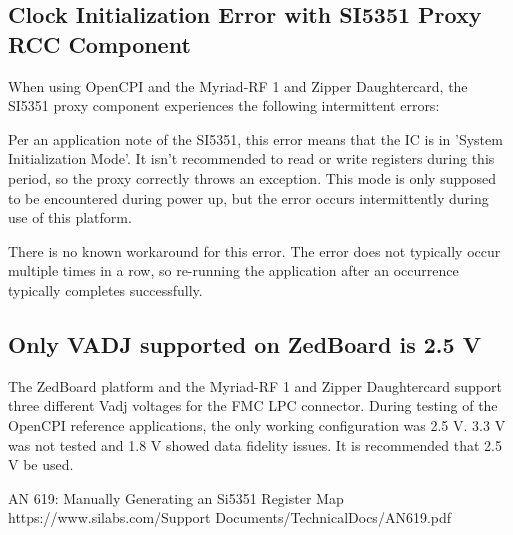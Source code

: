 \subsection*{Clock Initialization Error with SI5351 Proxy RCC Component}
When using OpenCPI and the Myriad-RF 1 and Zipper Daughtercard, the SI5351 proxy component experiences the following intermittent errors:\par\medskip
\noindent {}\par\medskip
\noindent {}\par\medskip
\noindent Per an application note of the SI5351\cite{an_619}, this error means that the IC is in 'System Initialization Mode'. It isn't recommended to read or write registers during this period, so the proxy correctly throws an exception. This mode is only supposed to be encountered during power up, but the error occurs intermittently  during use of this platform.\par\medskip
\noindent There is no known workaround for this error. The error does not typically occur multiple times in a row, so re-running the application after an occurrence typically completes successfully.
\subsection*{Only VADJ supported on ZedBoard is 2.5 V}
The ZedBoard platform  and the Myriad-RF 1 and Zipper Daughtercard support three different Vadj voltages for the FMC LPC connector. During testing of the OpenCPI reference applications, the only working configuration was 2.5 V. 3.3 V was not tested and 1.8 V showed data fidelity issues.  It is recommended that 2.5 V be used.
\pagebreak
  \begin{thebibliography}{1}

   AN 619: Manually Generating an Si5351 Register Map\\
  https://www.silabs.com/Support Documents/TechnicalDocs/AN619.pdf

  \end{thebibliography}

